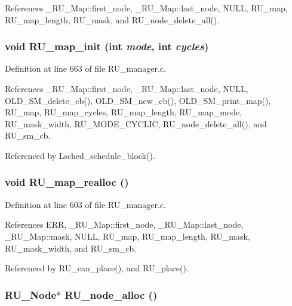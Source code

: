 References \_\-RU\_\-Map::first\_\-node, \_\-RU\_\-Map::last\_\-node, NULL, RU\_\-map, RU\_\-map\_\-length, RU\_\-mask, and RU\_\-node\_\-delete\_\-all().
\subsubsection{\setlength{\rightskip}{0pt plus 5cm}void RU\_\-map\_\-init (int {\em mode}, int {\em cycles})}\label{RU__manager_8c_9fd19f8a47592bd1bf712ea4aa1ac59c}




Definition at line 663 of file RU\_\-manager.c.

References \_\-RU\_\-Map::first\_\-node, \_\-RU\_\-Map::last\_\-node, NULL, OLD\_\-SM\_\-delete\_\-cb(), OLD\_\-SM\_\-new\_\-cb(), OLD\_\-SM\_\-print\_\-map(), RU\_\-map, RU\_\-map\_\-cycles, RU\_\-map\_\-length, RU\_\-map\_\-mode, RU\_\-mask\_\-width, RU\_\-MODE\_\-CYCLIC, RU\_\-node\_\-delete\_\-all(), and RU\_\-sm\_\-cb.

Referenced by Lsched\_\-schedule\_\-block().
\subsubsection{\setlength{\rightskip}{0pt plus 5cm}void RU\_\-map\_\-realloc ()}\label{RU__manager_8c_8d236d81b60c9e8059d44b25b79f0d7b}




Definition at line 603 of file RU\_\-manager.c.

References ERR, \_\-RU\_\-Map::first\_\-node, \_\-RU\_\-Map::last\_\-node, \_\-RU\_\-Map::mask, NULL, RU\_\-map, RU\_\-map\_\-length, RU\_\-mask, RU\_\-mask\_\-width, and RU\_\-sm\_\-cb.

Referenced by RU\_\-can\_\-place(), and RU\_\-place().
\subsubsection{\setlength{\rightskip}{0pt plus 5cm}\bf{RU\_\-Node}$\ast$ RU\_\-node\_\-alloc ()}\label{RU__manager_8c_a889b1b89b178b55414274fe9e308863}




